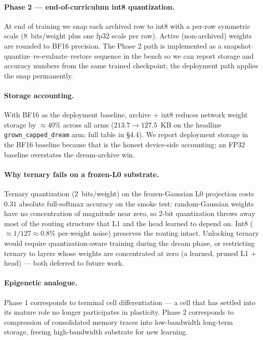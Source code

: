 \documentclass[11pt]{article}
\begin{document}
\paragraph{Phase 2 --- end-of-curriculum int8 quantization.}
At end of training we snap each archived row to int8 with a per-row
symmetric scale ($8$~bits/weight plus one fp32 scale per row). Active
(non-archived) weights are rounded to BF16 precision. The Phase 2 path is
implemented as a snapshot--quantize--re-evaluate--restore sequence in the
bench so we can report storage and accuracy numbers from the same trained
checkpoint; the deployment path applies the snap permanently.

\paragraph{Storage accounting.}
With BF16 as the deployment baseline, archive $+$ int8 reduces network
weight storage by $\approx\!40\%$ across all arms ($213.7 \to 127.5$~KB on
the headline \texttt{grown\_capped\_dream} arm; full table in \S4.4). We
report deployment storage in the BF16 baseline because that is the honest
device-side accounting; an FP32 baseline overstates the dream-archive win.

\paragraph{Why ternary fails on a frozen-L0 substrate.}
Ternary quantization ($2$~bits/weight) on the frozen-Gaussian L0
projection costs $0.31$ absolute full-softmax accuracy on the smoke test:
random-Gaussian weights have no concentration of magnitude near zero, so
$2$-bit quantization throws away most of the routing structure that L1
and the head learned to depend on. Int8 ($\approx 1/127 \approx 0.8\%$
per-weight noise) preserves the routing intact. Unlocking ternary would
require quantization-aware training during the dream phase, or restricting
ternary to layers whose weights are concentrated at zero (a learned,
pruned L1 + head) --- both deferred to future work.

\paragraph{Epigenetic analogue.}
Phase 1 corresponds to terminal cell differentiation --- a cell that has
settled into its mature role no longer participates in plasticity. Phase 2
corresponds to compression of consolidated memory traces into
low-bandwidth long-term storage, freeing high-bandwidth substrate for new
learning.
\end{document}
